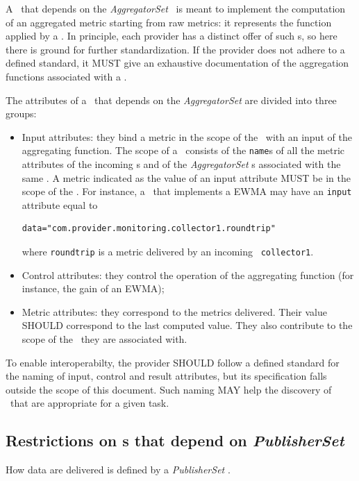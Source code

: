 \documentclass[12pt]{article}  %
\begin{document}
A \mi\ that depends on the {\em AggregatorSet} \mi\ is meant to implement the computation of an aggregated metric starting from raw metrics: it represents the function applied by a \sens. In principle, each provider has a distinct offer of such \mi s, so here there is ground for further standardization. If the provider does not adhere to a defined standard, it MUST give an exhaustive documentation of the aggregation functions associated with a \mi.

The attributes of a \mi\ that depends on the {\em AggregatorSet} are divided into three groups:

\begin{itemize}
\item Input attributes: they bind a metric in the scope of the \sens\ with an input of the aggregating function. The scope of a \sens\ consists of the {\tt name}s of all the metric attributes of the incoming \coll s and of the {\em AggregatorSet} \mi s associated with the same \sens . A metric indicated as the value of an input attribute MUST be in the scope of the \sens . For instance, a \sens\ that implements a EWMA may have an {\tt input} attribute equal to 
\begin{verbatim}
data="com.provider.monitoring.collector1.roundtrip"
\end{verbatim}
where \verb&roundtrip& is a metric delivered by an incoming \coll\ {\tt collector1}.
\item Control attributes: they control the operation of the aggregating function (for instance, the gain of an EWMA);
\item Metric attributes: they correspond to the metrics delivered. Their value SHOULD correspond to the last computed value. They also contribute to the scope of the \sens\ they are associated with.
\end{itemize}

To enable interoperabilty, the provider SHOULD follow a defined standard for the naming of input, control and result attributes, but its specification falls outside the scope of this document. Such naming MAY help the discovery of \mi\ that are appropriate for a given task.

\subsection{Restrictions on \mi s that depend on {\em PublisherSet} \label{sec:Publisher}}

How data are delivered is defined by a {\em PublisherSet} \mi .
\end{document}
